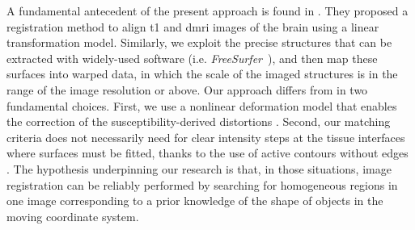 A fundamental antecedent of the present approach is found in \citep{greve_accurate_2009}.
They proposed a registration method to align \gls*{t1} and \gls*{dmri} images
  of the brain using a linear transformation model.
Similarly, we exploit the precise structures that can be extracted with
  widely-used software (i.e. \emph{FreeSurfer}~\citep{fischl_freesurfer_2012}),
  and then map these surfaces into warped data, in which the scale of the
  imaged structures is in the range of the image resolution or above.
Our approach differs from \citep{greve_accurate_2009} in two fundamental choices.
First, we use a nonlinear deformation model that enables the correction of the
  susceptibility-derived distortions \citep{jezzard_correction_1995}.
Second, our matching criteria does not necessarily need for clear intensity
  steps at the tissue interfaces where surfaces must be fitted, thanks to the use of
  active contours without edges \cite{chan_active_2001}.
The hypothesis underpinning our research is that, in those situations,
  image registration can be reliably performed by searching for homogeneous
  regions in one image corresponding to a prior knowledge of the shape of objects in
  the moving coordinate system.
